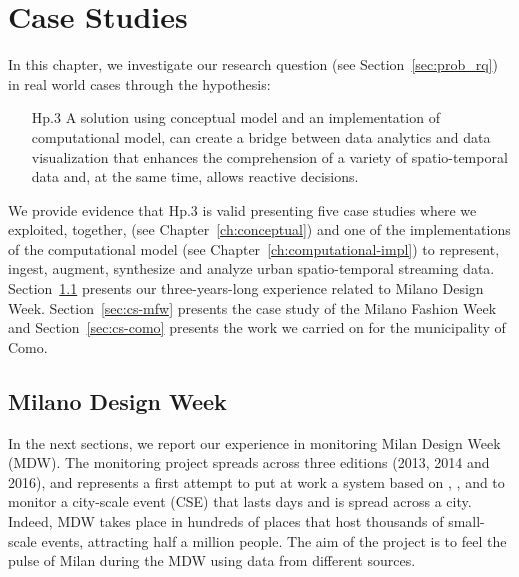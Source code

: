 \chapter{Case Studies}\label{ch:case-studies}

In this chapter, we investigate our research question (see Section~\ref{sec:prob_rq}) in real world cases through the hypothesis:
\begin{itemize}[leftmargin=42pt]
\item[\textsf{Hp.3}] A solution using \frappe{} conceptual model and an implementation of \river{} computational model, can create a bridge between data analytics and data visualization that enhances the comprehension of a variety of spatio-temporal data and, at the same time, allows reactive decisions.
\end{itemize}

We provide evidence that \textsf{Hp.3} is valid presenting five case studies where we exploited, together, \frappe{} (see Chapter~\ref{ch:conceptual}) and one of the implementations of the \river{} computational model (see Chapter~\ref{ch:computational-impl}) to represent, ingest, augment, synthesize and analyze urban spatio-temporal streaming data.
Section~\ref{sec:cs-mdw} presents our three-years-long experience related to Milano Design Week. Section~\ref{sec:cs-mfw} presents the case study of the Milano Fashion Week and Section~\ref{sec:cs-como} presents the work we carried on for the municipality of Como.

\section{Milano Design Week} \label{sec:cs-mdw}
In the next sections, we report our experience in monitoring Milan Design Week (MDW).
The monitoring project spreads across three editions (2013, 2014 and 2016), and represents a first attempt to put at work a system based on \frappe{}, \sti{}, \hivedi{} and \sparkdi{} to monitor a city-scale event (CSE) that lasts days and is spread across a city.
Indeed, MDW takes place in hundreds of places that host thousands of small-scale events, attracting half a million people.
The aim of the project is to feel the pulse of Milan during the MDW using data from different sources.

